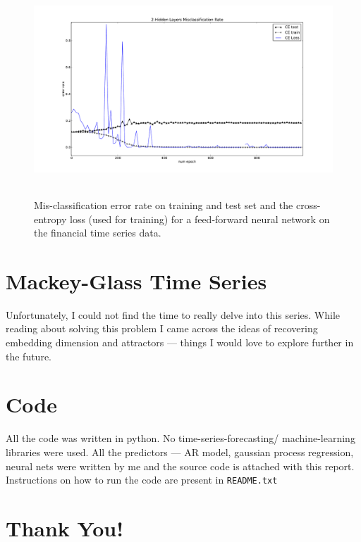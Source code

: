 \documentclass[11pt]{report}
\begin{document}
\begin{figure}[hbp]
\begin{center}
\includegraphics[width=18cm,height=8cm]{figs/two_layer_finance.pdf}
\end{center}
\caption[]{Mis-classification error rate on training and test set and the cross-entropy loss (used for training) for a feed-forward neural network on the financial time series data.}
\label{fig:nn}
\end{figure}
\clearpage

\section*{Mackey-Glass Time Series}
Unfortunately, I could not find the time to really delve into this series. While reading about solving this problem I came across the ideas of recovering embedding dimension and attractors --- things I would love to explore further in the future.
\section*{Code}
All the code was written in python. No time-series-forecasting/ machine-learning libraries were used. All the predictors --- AR model, gaussian process regression, neural nets were written by me and the source code is attached with this report. Instructions on how to run the code are present in \texttt{README.txt}
\section*{Thank You!}
\end{document}
